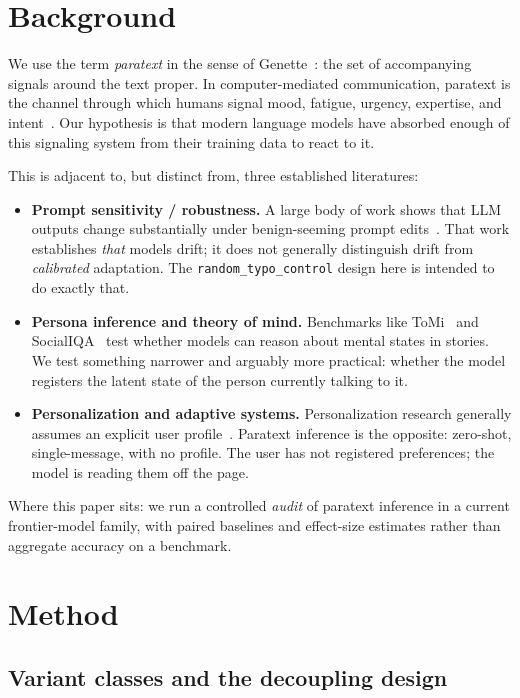 \documentclass[10pt, letterpaper]{article}
\newcommand{\code}[1]{\texttt{#1}}
\begin{document}
\section{Background}
\label{sec:background}

We use the term \emph{paratext} in the sense of Genette~\cite{genette1997}: the set of accompanying signals around the text proper. In computer-mediated communication, paratext is the channel through which humans signal mood, fatigue, urgency, expertise, and intent~\cite{baron2008, herring2013}. Our hypothesis is that modern language models have absorbed enough of this signaling system from their training data to react to it.

This is adjacent to, but distinct from, three established literatures:
\begin{itemize}[leftmargin=1.5em, itemsep=0pt]
  \item \textbf{Prompt sensitivity / robustness.} A large body of work shows that LLM outputs change substantially under benign-seeming prompt edits~\cite{sclar2024, salinas2024}. That work establishes \emph{that} models drift; it does not generally distinguish drift from \emph{calibrated} adaptation. The \code{random\_typo\_control} design here is intended to do exactly that.
  \item \textbf{Persona inference and theory of mind.} Benchmarks like ToMi~\cite{le2019} and SocialIQA~\cite{sap2019} test whether models can reason about mental states in stories. We test something narrower and arguably more practical: whether the model registers the latent state of the person currently talking to it.
  \item \textbf{Personalization and adaptive systems.} Personalization research generally assumes an explicit user profile~\cite{salemi2023}. Paratext inference is the opposite: zero-shot, single-message, with no profile. The user has not registered preferences; the model is reading them off the page.
\end{itemize}

Where this paper sits: we run a controlled \emph{audit} of paratext inference in a current frontier-model family, with paired baselines and effect-size estimates rather than aggregate accuracy on a benchmark.

\section{Method}
\label{sec:method}

\subsection{Variant classes and the decoupling design}
\end{document}
